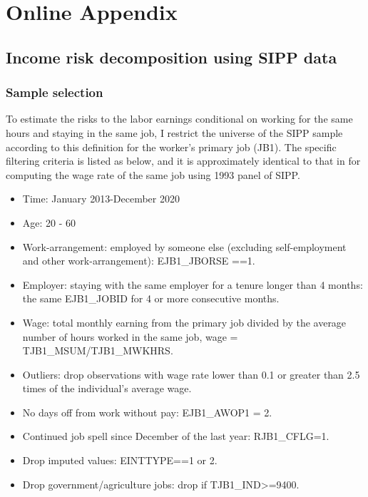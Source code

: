 \pagebreak 

\appendix
\setcounter{figure}{0} \renewcommand{\thefigure}{A.\arabic{figure}}
\setcounter{table}{0} \renewcommand{\thetable}{A.\arabic{table}}
\section{Online Appendix}
\label{sec:appendix}

\subsection{Income risk decomposition using SIPP data}
\label{appendix:sipp_data}
\subsubsection{Sample selection}

To estimate the risks to the labor earnings conditional on working for the same hours and staying in the same job, I restrict the universe of the SIPP sample according to this definition for the worker's primary job (JB1). The specific filtering criteria is listed as below, and it is approximately identical to that in \cite{low2010wage} for computing the wage rate of the same job using 1993 panel of SIPP. 

\begin{itemize}
    \item Time: January 2013-December 2020
    \item Age: 20 - 60
    \item Work-arrangement: employed by someone else (excluding self-employment and other work-arrangement): EJB1\_JBORSE ==1.
    \item Employer: staying with the same employer for a tenure longer than 4 months: the same EJB1\_JOBID for  4 or more consecutive months. 
    \item Wage: total monthly earning from the primary job divided by the average number of hours worked in the same job, wage = TJB1\_MSUM/TJB1\_MWKHRS.
    \item Outliers: drop observations with wage rate lower than 0.1 or greater than 2.5 times of the individual's average wage.
    \item No days off from work without pay: EJB1\_AWOP1 = 2. 
    \item Continued job spell since December of the last year: RJB1\_CFLG=1.
    \item Drop imputed values: EINTTYPE==1 or 2.
    \item Drop government/agriculture jobs: drop if TJB1\_IND>=9400.
\end{itemize}

